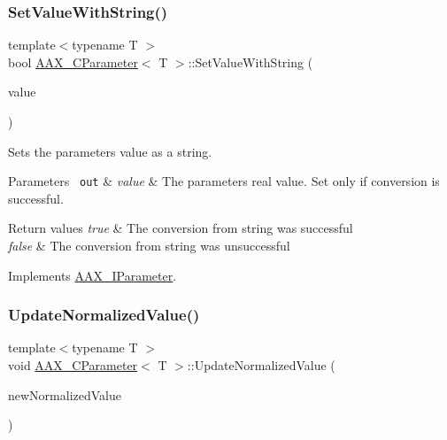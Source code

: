 \subsubsection{\texorpdfstring{SetValueWithString()}{SetValueWithString()}\hspace{0.1cm}{\footnotesize\ttfamily [1/2]}}
{\footnotesize\ttfamily template$<$typename T $>$ \\
bool \mbox{\hyperlink{a01537}{A\+A\+X\+\_\+\+C\+Parameter}}$<$ T $>$\+::Set\+Value\+With\+String (\begin{DoxyParamCaption}\item[{const \mbox{\hyperlink{a01873}{A\+A\+X\+\_\+\+I\+String}} \&}]{value }\end{DoxyParamCaption})\hspace{0.3cm}{\ttfamily [virtual]}}



Sets the parameter\textquotesingle{}s value as a string. 


\begin{DoxyParams}[1]{Parameters}
\mbox{\texttt{ out}}  & {\em value} & The parameter\textquotesingle{}s real value. Set only if conversion is successful.\\
\hline
\end{DoxyParams}

\begin{DoxyRetVals}{Return values}
{\em true} & The conversion from string was successful \\
\hline
{\em false} & The conversion from string was unsuccessful \\
\hline
\end{DoxyRetVals}


Implements \mbox{\hyperlink{a01857_a0f1ecef3d86f0ea1fef4255a9294d1df}{A\+A\+X\+\_\+\+I\+Parameter}}.

\mbox{\label{a01537_a8a70b3c8bcff486c18e9a6e5c8ce4dda}} 
\subsubsection{\texorpdfstring{UpdateNormalizedValue()}{UpdateNormalizedValue()}}
{\footnotesize\ttfamily template$<$typename T $>$ \\
void \mbox{\hyperlink{a01537}{A\+A\+X\+\_\+\+C\+Parameter}}$<$ T $>$\+::Update\+Normalized\+Value (\begin{DoxyParamCaption}\item[{double}]{new\+Normalized\+Value }\end{DoxyParamCaption})\hspace{0.3cm}{\ttfamily [virtual]}}



